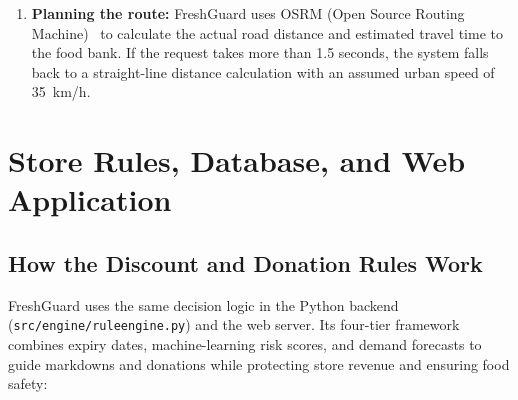 \documentclass[12pt,a4paper]{article}
\renewcommand{\_}{\oldunderscore\allowbreak}
\begin{document}
\begin{enumerate}[leftmargin=18pt, itemsep=2.5pt]
\begin{itemize}[leftmargin=14pt, itemsep=1.5pt]
        \item \emph{The Lost Food Project (TLFP):} Seksyen 5 Kota Damansara; 800~kg capacity; accepts dry goods, grains, and produce.
        \item \emph{Yayasan Food Bank Malaysia:} Bukit Jelutong, Shah Alam; 1,200~kg capacity; accepts ambient and cold-chain goods.
        \item \emph{Kechara Soup Kitchen:} Jalan Imbi, Kuala Lumpur; 500~kg capacity; accepts cooked food and fast-moving groceries.
        \item \emph{Pit Stop Community Cafe:} Chinatown KL; accepts ambient pantry and bakery items.
    \end{itemize}
    \item \textbf{Planning the route:} FreshGuard uses OSRM (Open Source Routing Machine)~\cite{osrm} to calculate the actual road distance and estimated travel time to the food bank. If the request takes more than 1.5 seconds, the system falls back to a straight-line distance calculation with an assumed urban speed of 35~km/h.
\end{enumerate}

\section{Store Rules, Database, and Web Application}

\subsection{How the Discount and Donation Rules Work}
FreshGuard uses the same decision logic in the Python backend (\texttt{src/engine/rule\_engine.py}) and the web server. Its four-tier framework combines expiry dates, machine-learning risk scores, and demand forecasts to guide markdowns and donations while protecting store revenue and ensuring food safety:
\end{document}
